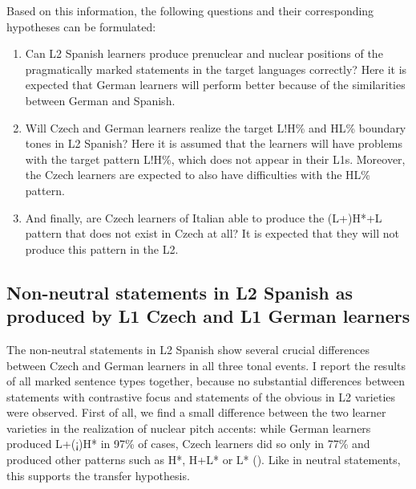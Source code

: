 Based on this information, the following questions and their corresponding hypotheses can be formulated:

\begin{enumerate}[label=H\arabic*,font=\PeskovaColonAfterItem]
\item\label{nonneutral-h1}
 Can L2 Spanish learners produce prenuclear and nuclear positions of the pragmatically marked statements in the target languages correctly? Here it is expected that German learners will perform better because of the similarities between German and Spanish.

\item\label{nonneutral-h2}
 Will Czech and German learners realize the target L!H\% and HL\% boundary tones in L2 Spanish? Here it is assumed that the learners will have problems with the target pattern L!H\%, which does not appear in their L1s. Moreover, the Czech learners are expected to also have difficulties with the HL\% pattern.

\item\label{nonneutral-h3}
 And finally, are Czech learners of Italian able to produce the (L+)H*+L pattern that does not exist in Czech at all? It is expected that they will not produce this pattern in the L2.
\end{enumerate}

\subsection{Non-neutral statements in L2 Spanish as produced by L1 Czech and L1 German learners}\label{sec:4.2.2}

The non-neutral statements in L2 Spanish show several crucial differences between Czech and German learners in all three tonal events. I report the results of all marked sentence types together, because no substantial differences between statements with contrastive focus and statements of the obvious in L2 varieties were observed. First of all, we find a small difference between the two learner varieties in the realization of nuclear pitch accents: while German learners produced L+(¡)H* in 97\% of cases, Czech learners did so only in 77\% and produced other patterns such as H*, H+L* or L* (). Like in neutral statements, this supports the transfer hypothesis.

